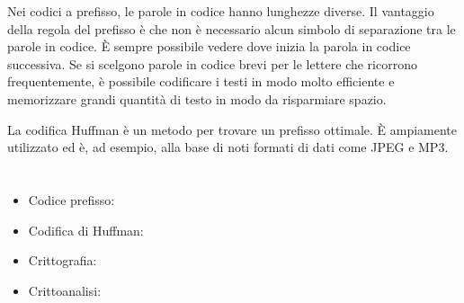 {{Nei codici a prefisso, le parole in codice hanno lunghezze diverse. Il vantaggio della regola del prefisso è che non è necessario alcun simbolo di separazione tra le parole in codice. È sempre possibile vedere dove inizia la parola in codice successiva. Se si scelgono parole in codice brevi per le lettere che ricorrono frequentemente, è possibile codificare i testi in modo molto efficiente e memorizzare grandi quantità di testo in modo da risparmiare spazio.

La codifica Huffman è un metodo per trovare un prefisso ottimale. È ampiamente utilizzato ed è, ad esempio, alla base di noti formati di dati come JPEG e MP3.



\section*{\BrochureWebsitesAndKeywords}
{\raggedright
\begin{itemize}
  \item Codice prefisso: \href{https://it.wikipedia.org/wiki/Codice_prefisso}{}
  \item Codifica di Huffman: \href{https://it.wikipedia.org/wiki/Codifica_di_Huffman}{}
  \item Crittografia: \href{https://it.wikipedia.org/wiki/Crittografia}{}
  \item Crittoanalisi: \href{https://it.wikipedia.org/wiki/Crittoanalisi}{}
\end{itemize}


}

}{}

\def\AuthorPozdniakovS{} %
\def\AuthorPosovI{} %
\def\AuthorPrettiJ{} %
\def\AuthorMalchiodiD{} %
\def\AuthorWeigendM{} %
\def\AuthorPohlW{} %
\def\AuthorDatzkoC{} %
\def\AuthorGiangC{} %

\newpage}{}
